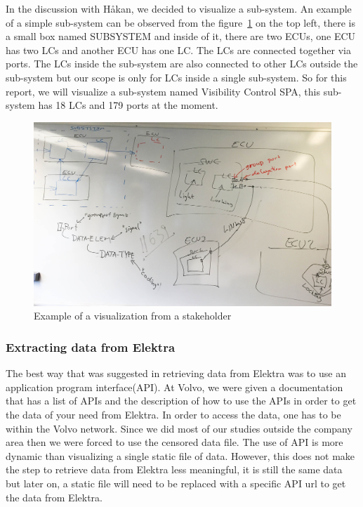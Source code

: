 In the discussion with Håkan, we decided to visualize a sub-system. An example of a simple sub-system can be observed from the figure~\ref{fig:hakan-diagram-board} on the top left, there is a small box named SUBSYSTEM and inside of it, there are two ECUs, one ECU has two LCs and another ECU has one LC. The LCs are connected together via ports. The LCs inside the sub-system are also connected to other LCs outside the sub-system but our scope is only for LCs inside a single sub-system. So for this report, we will visualize a sub-system named Visibility Control SPA, this sub-system has 18 LCs and 179 ports at the moment.\\


\begin{figure}[H]
\centering
\captionsetup{justification=centering}
\vspace{0cm}%
\includegraphics[width=0.85\linewidth]{figure/misc/Hakan.jpg}
\caption{Example of a visualization from a stakeholder}
\label{fig:hakan-diagram-board}
\end{figure}

\subsubsection{Extracting data from Elektra}
The best way that was suggested in retrieving data from Elektra was to use an application program interface(API). At Volvo, we were given a documentation that has a list of APIs and the description of how to use the APIs in order to get the data of your need from Elektra. In order to access the data, one has to be within the Volvo network. Since we did most of our studies outside the company area then we were forced to use the censored data file. The use of API is more dynamic than visualizing a single static file of data. However, this does not make the step to retrieve data from Elektra less meaningful, it is still the same data but later on, a static file will need to be replaced with a specific API url to get the data from Elektra.\\

